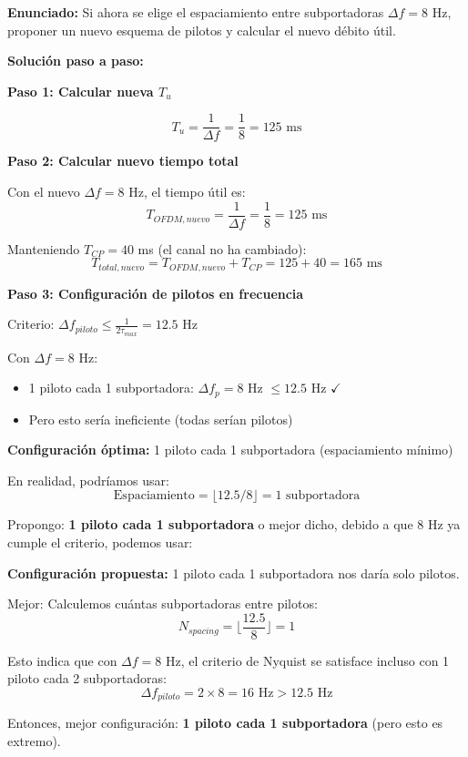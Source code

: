 \documentclass[11pt,a4paper]{article}
\begin{document}
\textbf{Enunciado:} Si ahora se elige el espaciamiento entre subportadoras $\Delta f = 8$ Hz, proponer un nuevo esquema de pilotos y calcular el nuevo débito útil.

\vspace{0.3cm}
\textbf{Solución paso a paso:}

\textbf{Paso 1: Calcular nueva $T_u$}

\[
T_u = \frac{1}{\Delta f} = \frac{1}{8} = 125 \text{ ms}
\]

\textbf{Paso 2: Calcular nuevo tiempo total}

Con el nuevo $\Delta f = 8$ Hz, el tiempo útil es:
\[
T_{OFDM,nuevo} = \frac{1}{\Delta f} = \frac{1}{8} = 125 \text{ ms}
\]

Manteniendo $T_{CP} = 40$ ms (el canal no ha cambiado):
\[
T_{total,nuevo} = T_{OFDM,nuevo} + T_{CP} = 125 + 40 = 165 \text{ ms}
\]

\textbf{Paso 3: Configuración de pilotos en frecuencia}

Criterio: $\Delta f_{piloto} \leq \frac{1}{2\tau_{max}} = 12.5$ Hz

Con $\Delta f = 8$ Hz:
\begin{itemize}
    \item 1 piloto cada 1 subportadora: $\Delta f_{p} = 8$ Hz $\leq 12.5$ Hz $\checkmark$
    \item Pero esto sería ineficiente (todas serían pilotos)
\end{itemize}

\textbf{Configuración óptima:} 1 piloto cada 1 subportadora (espaciamiento mínimo)

En realidad, podríamos usar:
\[
\text{Espaciamiento} = \lfloor 12.5 / 8 \rfloor = 1 \text{ subportadora}
\]

Propongo: \textbf{1 piloto cada 1 subportadora} o mejor dicho, debido a que 8 Hz ya cumple el criterio, podemos usar:

\textbf{Configuración propuesta:} 1 piloto cada 1 subportadora nos daría solo pilotos.

Mejor: Calculemos cuántas subportadoras entre pilotos:
\[
N_{spacing} = \lfloor \frac{12.5}{8} \rfloor = 1
\]

Esto indica que con $\Delta f = 8$ Hz, el criterio de Nyquist se satisface incluso con 1 piloto cada 2 subportadoras:
\[
\Delta f_{piloto} = 2 \times 8 = 16 \text{ Hz} > 12.5 \text{ Hz}
\]

Entonces, mejor configuración: \textbf{1 piloto cada 1 subportadora} (pero esto es extremo).
\end{document}
